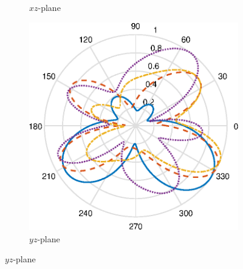 \begin{figure}[H]
\begin{subfigure}[b]{0.3\textwidth}
        \caption{$xz$-plane}
        \label{fig:ff_xz_cell}
    \end{subfigure}
    \begin{subfigure}[b]{0.3\textwidth}
        \includegraphics[width=\textwidth]{img/ff_cell_yz.eps}
        \caption{$yz$-plane}
        \label{fig:ff_yz_cell}
    \end{subfigure}
    

\end{figure}
